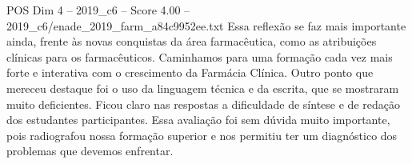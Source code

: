\begin{textsample}{POS Dim 4 – 2019\_c6 – Score 4.00 – 2019\_c6/enade\_2019\_farm\_a84c9952ee.txt}
Essa reflexão se faz mais importante ainda, frente às novas conquistas da área farmacêutica, como as atribuições clínicas para os farmacêuticos.
Caminhamos para uma formação cada vez mais forte e interativa com o crescimento da Farmácia Clínica.
Outro ponto que mereceu destaque foi o uso da linguagem técnica e da escrita, que se mostraram muito deficientes.
Ficou claro nas respostas a dificuldade de síntese e de redação dos estudantes participantes.
Essa avaliação foi sem dúvida muito importante, pois radiografou nossa formação superior e nos permitiu ter um diagnóstico dos problemas que devemos enfrentar.

\end{textsample}
